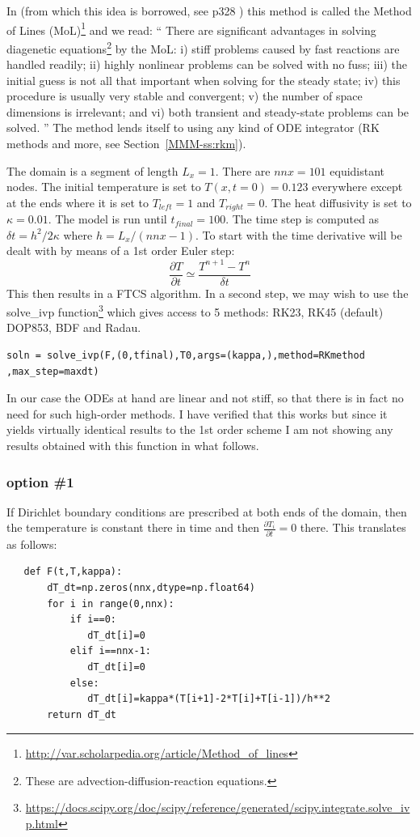In \textcite{boudreau} (from which this idea is borrowed, see p328 )
this method is called the Method of Lines (MoL)\footnote{\url{http://var.scholarpedia.org/article/Method_of_lines}} and we read:
``
There are significant advantages in solving diagenetic equations\footnote{These
are advection-diffusion-reaction equations.} by the MoL: 
i) stiff problems caused by fast reactions are handled readily; 
ii) highly nonlinear problems can be solved with no fuss; 
iii) the initial guess is not all that important when solving for the steady state; 
iv) this procedure is usually very stable and convergent; 
v) the number of space dimensions is irrelevant; and 
vi) both transient and steady-state problems can be solved.
''
The method lends itself to using any kind of ODE integrator (RK methods and more, 
see Section~\ref{MMM-ss:rkm}).

The domain is a segment of length $L_x=1$. There are $nnx=101$ equidistant nodes. 
The initial temperature is set to $T(x,t=0)=0.123$ everywhere 
except at the ends where it is set to $T_{left}=1$ and $T_{right}=0$.
The heat diffusivity is set to $\kappa=0.01$. The model is run until $t_{final}=100$.
The time step is computed as $\delta t=h^2/2\kappa$ where $h=L_x/(nnx-1)$.
To start with the time derivative will be dealt with by means of a 1st order
Euler step:
\[
\frac{\partial T}{\partial t} \simeq \frac{T^{n+1}-T^n}{\delta t}
\]
This then results in a FTCS algorithm.
In a second step, we may wish to use the {\python solve\_ivp} 
function\footnote{\url{https://docs.scipy.org/doc/scipy/reference/generated/scipy.integrate.solve_ivp.html}}
which gives access to 5 methods: RK23, RK45 (default) DOP853, BDF and Radau.

\begin{lstlisting}
soln = solve_ivp(F,(0,tfinal),T0,args=(kappa,),method=RKmethod ,max_step=maxdt)
\end{lstlisting}

In our case the ODEs at hand are linear and not stiff, so that 
there is in fact no need for such high-order methods.
I have verified that this works but since it yields virtually identical 
results to the 1st order scheme I am not showing any results obtained with this function in what follows.

\subsubsection*{option \#1}

If Dirichlet boundary conditions are prescribed at both ends of the domain, 
then the temperature is constant there in time and then $\frac{\partial T_i}{\partial t}=0$ there.
This translates as follows:
\begin{lstlisting}
   def F(t,T,kappa):
       dT_dt=np.zeros(nnx,dtype=np.float64)
       for i in range(0,nnx):
           if i==0:
              dT_dt[i]=0
           elif i==nnx-1: 
              dT_dt[i]=0
           else:
              dT_dt[i]=kappa*(T[i+1]-2*T[i]+T[i-1])/h**2
       return dT_dt
\end{lstlisting}

